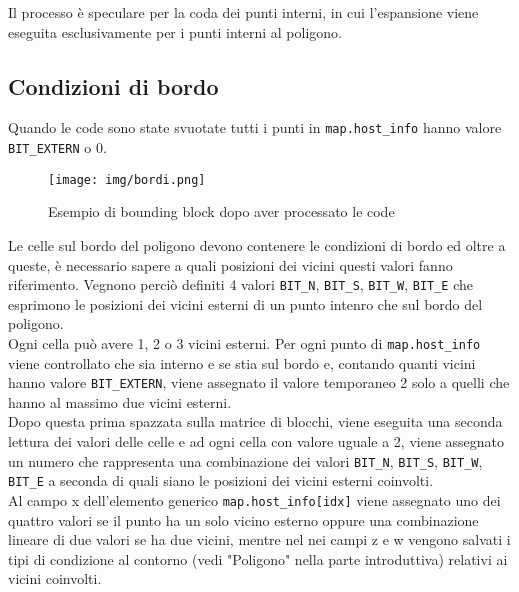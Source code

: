 			Il processo \`{e} speculare per la coda dei punti interni, in cui l'espansione viene eseguita esclusivamente per i punti interni al poligono.
		\subsection{Condizioni di bordo}
				Quando le code sono state svuotate tutti i punti in \texttt{map.host\_info} hanno valore \texttt{BIT\_EXTERN} o 0. 
				\begin{figure}[!htbp]
					\centering
					\texttt{[image: img/bordi.png]}
					\caption{Esempio di bounding block dopo aver processato le code}
				\end{figure}
				Le celle sul bordo del poligono devono contenere le condizioni di bordo ed oltre a queste, \`{e} necessario sapere a quali posizioni dei vicini questi valori fanno riferimento. Vegnono perci\`{o} definiti 4 valori \texttt{BIT\_N}, \texttt{BIT\_S}, \texttt{BIT\_W}, \texttt{BIT\_E} che esprimono le posizioni dei vicini esterni di un punto intenro che sul bordo del poligono.\\
				Ogni cella pu\`{o} avere 1, 2 o 3 vicini esterni. 
				Per ogni punto di \texttt{map.host\_info} viene controllato che sia interno e se stia sul bordo e, contando quanti vicini hanno valore \texttt{BIT\_EXTERN}, viene assegnato il valore temporaneo 2 solo a quelli che hanno al massimo due vicini esterni.\\
				Dopo questa prima spazzata sulla matrice di blocchi, viene eseguita una seconda lettura dei valori delle celle e ad ogni cella con valore uguale a 2, viene assegnato un numero che rappresenta una combinazione dei valori  \texttt{BIT\_N}, \texttt{BIT\_S}, \texttt{BIT\_W}, \texttt{BIT\_E} a seconda di quali siano le posizioni dei vicini esterni coinvolti. \\
				Al campo x dell'elemento generico \texttt{map.host\_info[idx]} viene assegnato uno dei quattro valori se il punto ha un solo vicino esterno oppure una combinazione lineare di due valori se ha due vicini, mentre nel nei campi z e w vengono salvati i tipi di condizione al contorno (vedi "Poligono" nella parte introduttiva) relativi ai vicini coinvolti.
